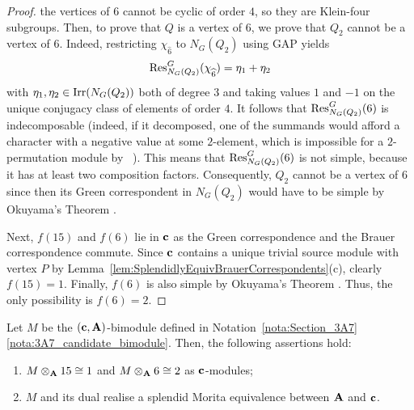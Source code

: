 \begin{proof}
the vertices of $6$ cannot be cyclic of order $4$, so they are Klein-four subgroups.  Then, to prove that $Q$ is a vertex of $6$, we prove that $Q_2$ cannot be a vertex of $6$. Indeed,  restricting $\chi^{}_{\widehat{6}}$ to $N_G(Q_2)$  using GAP yields
    \[
            \operatorname{Res}^{G}_{N_G(Q_2)}(\chi^{}_{\widehat{6}})=\eta_1+\eta_2
    \]
with $\eta_1,\eta_2\in\operatorname{Irr}(N_G(Q_2))$ both of degree $3$ and taking values $1$ and $-1$ on the unique conjugacy class of elements of order $4$. It follows that $\operatorname{Res}^{G}_{N_G(Q_2)}(6)$ is indecomposable (indeed, if it decomposed, one of the summands would afford a character with a negative value at some $2$-element, which is impossible for a $2$-permutation module by ~\cite[II Lemma 12.6(ii)]{LandrockBook}). This means that $\operatorname{Res}^{G}_{N_G(Q_2)}(6)$ is not simple, because it has at least two composition factors. Consequently, $Q_2$ cannot be a vertex of $6$ since then its Green correspondent in $N_G(Q_2)$ would have to be simple by Okuyama's Theorem \cite[Theorem~2.3]{Okuyama91}. %
\par
Next, $f(15)$ and $f(6)$ lie in ${\mathbf{c}}$ as the Green correspondence and the Brauer correspondence commute. Since ${\mathbf{c}}$ contains a unique trivial source module with vertex $P$ by Lemma~\ref{lem:SplendidlyEquivBrauerCorrespondents}(c), clearly $f(15)=1$. Finally, $f(6)$ is also simple by Okuyama's Theorem \cite[Theorem~2.3]{Okuyama91}. Thus, the only possibility is $f(6)=2$.
\end{proof}



\begin{lem}\label{lem:simple-tensor-M}%
Let $M$ be the $({\mathbf{c}},{\mathbf{A}})$-bimodule defined in Notation~\ref{nota:Section_3A7}{\rm\ref{nota:3A7_candidate_bimodule}}. Then, the following assertions hold:
\begin{enumerate}[label={\rm(\alph*)}]
    \item $M\otimes_{{\mathbf{A}}}15\cong 1$ and $M\otimes_{{\mathbf{A}}}6\cong 2$ as ${\mathbf{c}}$-modules;
    \item $M$ and its dual realise a splendid Morita equivalence between ${\mathbf{A}}$ and ${\mathbf{c}}$.
\end{enumerate}
\end{lem}

